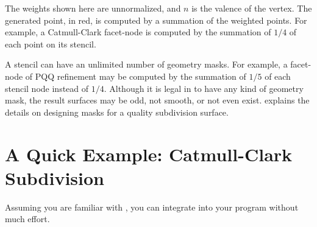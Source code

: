 The weights shown here are unnormalized, and $n$ is the valence 
of the vertex. The generated point, in red, is computed by a summation
of the weighted points. For example, a Catmull-Clark facet-node is 
computed by the summation of $1/4$ of each point on its stencil.

A stencil can have an unlimited number of geometry masks. For example, 
a facet-node of PQQ refinement may be computed by 
the summation of $1/5$ of each stencil node instead of $1/4$.
Although it is legal in  to have 
any kind of geometry mask, the result surfaces may be odd, 
not smooth, or not even exist. \cite{cgal:ww-smgd-02} explains the 
details on designing masks for a quality subdivision surface.






\section{A Quick Example: Catmull-Clark Subdivision}
\label{secFirstSub}
Assuming you are familiar with ,
you can integrate  into your program 
without much effort.

